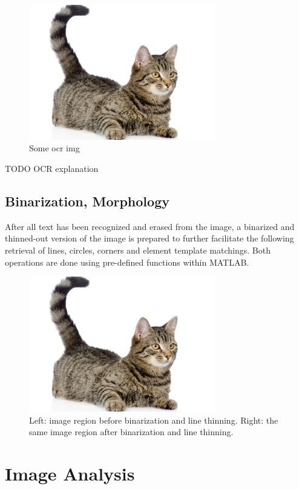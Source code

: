 \documentclass[10pt,twocolumn,letterpaper]{article}
\begin{document}
\begin{figure}[!ht]
\includegraphics[width = 3.2in]{img/cat.jpg}
\caption{Some ocr img}
\label{fig:c6}
\end{figure}
\par

TODO OCR explanation

\subsection{Binarization, Morphology}
\label{subsec:morph}

After all text has been recognized and erased from the image, a binarized and thinned-out version of the image is prepared to further facilitate the following retrieval of lines, circles, corners and element template matchings. Both operations are done using pre-defined functions within MATLAB.
\par

\begin{figure}[!ht]
\includegraphics[width = 3.2in]{img/cat.jpg}
\caption{Left: image region before binarization and line thinning. Right: the same image region after binarization and line thinning.}
\label{fig:c7}
\end{figure}


\section{Image Analysis}
\label{sec:analysis}
\end{document}
